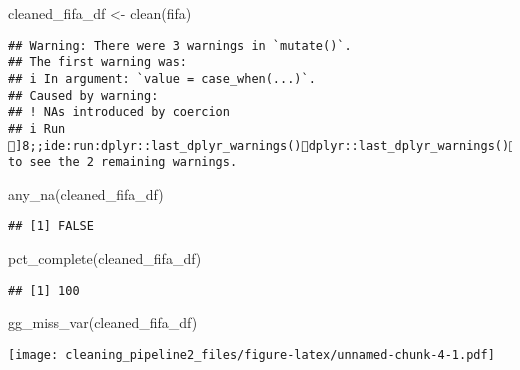 \documentclass[
]{article}
\newenvironment{Shaded}{\begin{snugshade}}{\end{snugshade}}
\newcommand{\FunctionTok}[1]{\textcolor[rgb]{0.00,0.00,0.00}{#1}}
\newcommand{\NormalTok}[1]{#1}
\newcommand{\OtherTok}[1]{\textcolor[rgb]{0.56,0.35,0.01}{#1}}
\begin{document}
\begin{Shaded}
\begin{Highlighting}[]
\NormalTok{cleaned\_fifa\_df }\OtherTok{\textless{}{-}} \FunctionTok{clean}\NormalTok{(fifa)}
\end{Highlighting}
\end{Shaded}

\begin{verbatim}
## Warning: There were 3 warnings in `mutate()`.
## The first warning was:
## i In argument: `value = case_when(...)`.
## Caused by warning:
## ! NAs introduced by coercion
## i Run ]8;;ide:run:dplyr::last_dplyr_warnings()dplyr::last_dplyr_warnings()]8;; to see the 2 remaining warnings.
\end{verbatim}

\begin{Shaded}
\begin{Highlighting}[]
\FunctionTok{any\_na}\NormalTok{(cleaned\_fifa\_df)}
\end{Highlighting}
\end{Shaded}

\begin{verbatim}
## [1] FALSE
\end{verbatim}

\begin{Shaded}
\begin{Highlighting}[]
\FunctionTok{pct\_complete}\NormalTok{(cleaned\_fifa\_df)}
\end{Highlighting}
\end{Shaded}

\begin{verbatim}
## [1] 100
\end{verbatim}

\begin{Shaded}
\begin{Highlighting}[]
\FunctionTok{gg\_miss\_var}\NormalTok{(cleaned\_fifa\_df)}
\end{Highlighting}
\end{Shaded}

\texttt{[image: cleaning\_pipeline2\_files/figure-latex/unnamed-chunk-4-1.pdf]}
\end{document}
